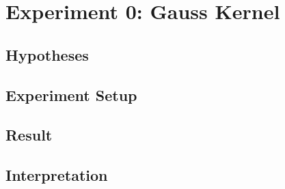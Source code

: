 \documentclass[./\jobname.tex]{subfiles}
\begin{document}
\chapter {Experiment 0: Gauss Kernel}
\label{chap:experimet_0}

\section{Hypotheses}

\section{Experiment Setup}

\section{Result}

\section{Interpretation}
\end{document}
